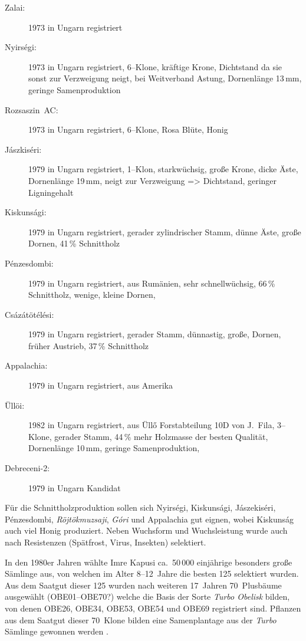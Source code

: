\documentclass[twocolumn]{scrartcl}
\begin{document}
\begin{description}
  \item[Zalai:] 1973 in Ungarn registriert \citep{keresztesi1983robinie}
  \item[Nyirségi:] 1973 in Ungarn registriert, 6--Klone, kräftige Krone, Dichtstand da sie sonst zur Verzweigung neigt, bei Weitverband Astung, Dornenlänge 13\,mm, geringe Samenproduktion \citep{keresztesi1983robinie,kapusi1995robinie,abri2024dis}
  \item[Rozsaszin~AC:] 1973 in Ungarn registriert, 6--Klone, Rosa Blüte, Honig \citep{keresztesi1983robinie,kapusi1995robinie}
  \item[Jászkiséri:] 1979 in Ungarn registriert, 1--Klon, starkwüchsig, große Krone, dicke Äste, Dornenlänge 19\,mm, neigt zur Verzweigung => Dichtstand, geringer Ligningehalt \citep{keresztesi1983robinie,zsombor1980robinie,kapusi1995robinie,abri2024dis}
  \item[Kiskunsági:] 1979 in Ungarn registriert, gerader zylindrischer Stamm, dünne Äste, große Dornen, 41\,\% Schnittholz \citep{keresztesi1983robinie,zsombor1980robinie}
  \item[Pénzesdombi:] 1979 in Ungarn registriert, aus Rumänien, sehr schnellwüchsig, 66\,\% Schnittholz, wenige, kleine Dornen, \citet{zsombor1980robinie}
  \item[Csázátötélési:] 1979 in Ungarn registriert, gerader Stamm, dünnastig, große, Dornen, früher Austrieb, 37\,\% Schnittholz \citep{zsombor1980robinie}
  \item[Appalachia:] 1979 in Ungarn registriert, aus Amerika
  \item[Üllöi:] 1982 in Ungarn registriert, aus Üllő Forstabteilung 10D von J.~Fila, 3--Klone, gerader Stamm, 44\,\% mehr Holzmasse der besten Qualität, Dornenlänge 10\,mm, geringe Samenproduktion, \citep{bach1983robinie,kapusi1995robinie,abri2024dis,redei2020ulloi}
  \item[Debreceni-2:] 1979 in Ungarn Kandidat \citep{keresztesi1983robinie}
\end{description}

Für die Schnittholzproduktion sollen sich Nyirségi, Kiskunsági, Jászekiséri,
Pénzesdombi, \emph{Röjtökmuzsaji}, \emph{Góri} und Appalachia gut eignen, wobei
Kiskunság auch viel Honig produziert. Neben Wuchsform und Wuchsleistung wurde
auch nach Resistenzen (Spätfrost, Virus, Insekten) selektiert.

In den 1980er Jahren wählte Imre Kapusi ca.\ 50\,000 einjährige
besonders große Sämlinge aus, von welchen im Alter 8--12~Jahre die
besten 125 selektiert wurden. Aus dem Saatgut dieser 125 wurden nach
weiteren 17~Jahren 70~Plusbäume ausgewählt (OBE01--OBE70?) welche die
Basis der Sorte \emph{Turbo Obelisk} bilden, von denen OBE26, OBE34,
OBE53, OBE54 und OBE69 registriert sind.
Pflanzen aus dem Saatgut dieser 70~Klone
bilden eine Samenplantage aus der \emph{Turbo} Sämlinge gewonnen
werden \citep{nemeth2022robinie}.
\end{document}
